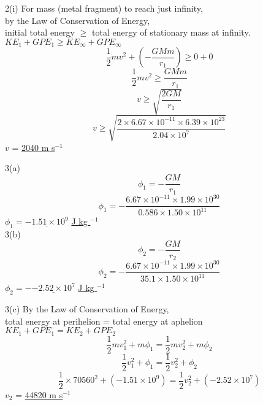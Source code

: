 \documentclass[10pt]{beamer}
\begin{document}
\begin{frame}
2(i) For mass (metal fragment) to reach just infinity,\\
by the Law of Conservation of Energy,\\
initial total energy $\ge$ total energy of stationary mass at infinity.\\
$ KE_1 + GPE_1 \ge KE_{\infty} + GPE_{\infty} $ \\
\[\frac{1}{2}mv^2 +  \left( -\frac{GMm}{r_1} \right) \ge 0 + 0  \]
\[\frac{1}{2}mv^2 \ge  \frac{GMm}{r_1} \]
\[ v \ge \sqrt{\frac{2GM}{r_1}}    \]
\[ v \ge \sqrt{\frac{2 \times 6.67 \times 10^{-11} \times 6.39 \times 10^{23}}{2.04 \times 10^7}}    \]
$v$ = \underline{2040 m s$^{-1}$} \\
\end{frame} 


\begin{frame}
3(a)
\[\phi_1 = -\frac{GM}{r_1}  \]
\[\phi_1 = -\frac{6.67 \times 10^{-11} \times 1.99 \times 10^{30}}{0.586 \times 1.50 \times 10^{11}}  \]
\vspace{10pt}
$ \phi_1 = \underline{-1.51 \times 10^9} $ \underline{J kg $^{-1}$} \\
\vspace{10pt}
3(b)
\[\phi_2 = -\frac{GM}{r_2}  \]
\[\phi_2 = -\frac{6.67 \times 10^{-11} \times 1.99 \times 10^{30}}{35.1 \times 1.50 \times 10^{11}}  \]
\vspace{10pt}
$ \phi_2 = -\underline{-2.52 \times 10^7} $ \underline{J kg $^{-1}$ }\\
\end{frame}

\begin{frame}
3(c)
By the Law of Conservation of Energy,\\
total energy at perihelion = total energy at aphelion \\
$KE_1 + GPE_1 = KE_2 + GPE_2 $\\
\[ \frac{1}{2}mv_1^2 + m \phi_1 =  \frac{1}{2}mv_2^2 + m \phi_2   \]
\[ \frac{1}{2}v_1^2 + \phi_1 =  \frac{1}{2}v_2^2 + \phi_2   \]
\[ \frac{1}{2}\times 70560^2 + (-1.51 \times 10^9) =  \frac{1}{2}v_2^2 + (-2.52 \times 10^7)   \]
\vspace{10pt}
$ v_2$ = \underline{44820 m s$^{-1}$} \\

\end{frame}
\end{document}
